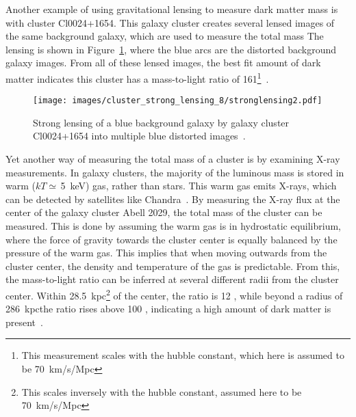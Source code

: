     Another example of using gravitational lensing to measure dark matter mass is with cluster Cl0024+1654.
    This galaxy cluster creates several lensed images of the same background galaxy, which are used to measure the total mass
    The lensing is shown in Figure~\ref{fig:stronglens}, where the blue arcs are the distorted background galaxy images.
    From all of these lensed images, the best fit amount of dark matter indicates this cluster has a mass-to-light ratio of \SI{161}{}\MLsol{}\footnote[3]{This measurement scales with the hubble constant, which here is assumed to be \SI{70}{km/s/Mpc}}~\cite{cluster_strong_lensing_1996, cluster_strong_lensing_1998, cluster_strong_lensing_2010}.
    
    \begin{figure}
      \centering
      \texttt{[image: images/cluster\_strong\_lensing\_8/stronglensing2.pdf]}
      \caption[Gravitational Lensing in Cl0024+1654]{
        Strong lensing of a blue background galaxy by galaxy cluster Cl0024+1654 into multiple blue distorted images~\cite{cluster_strong_lensing_1996}.
      }
      \label{fig:stronglens}
    \end{figure}
    
    Yet another way of measuring the total mass of a cluster is by examining X-ray measurements.
    In galaxy clusters, the majority of the luminous mass is stored in warm ($kT\simeq\,$\SI{5}{keV}) gas, rather than stars.
    This warm gas emits X-rays, which can be detected by satellites like Chandra~\cite{chandra}.
    By measuring the X-ray flux at the center of the galaxy cluster Abell 2029, the total mass of the cluster can be measured.
    This is done by assuming the warm gas is in hydrostatic equilibrium, where the force of gravity towards the cluster center is equally balanced by the pressure of the warm gas.
    This implies that when moving outwards from the cluster center, the density and temperature of the gas is predictable.
    From this, the mass-to-light ratio can be inferred at several different radii from the cluster center.
    Within \SI{28.5}{kpc}\footnote[2]{This scales inversely with the hubble constant, assumed here to be \SI{70}{km/s/Mpc}} of the center, the ratio is 12 \MLsol, while beyond a radius of \SI{286}{kpc}\footnotemark[2] the ratio rises above 100 \MLsol{}, indicating a high amount of dark matter is present~\cite{cluster_chandra}.
    
